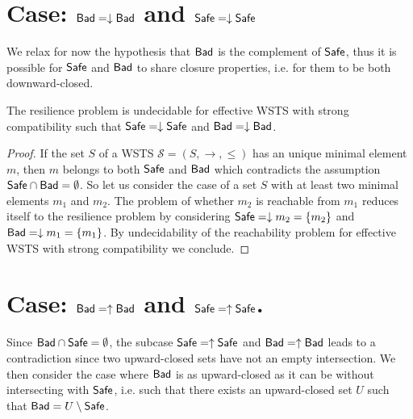 

\section{Case: $\textsf{Bad}=\downarrow \textsf{Bad}$ and $\textsf{Safe}=\downarrow \textsf{Safe}$}\label{case down down}

We relax for now the hypothesis that $\Bad$ is the complement of $\Safe$, thus it is possible for $\Safe$ and $\Bad$ to share closure properties, i.e. for them to be both downward-closed.



\begin{theorem}\label{down-down}
The resilience problem is undecidable for  effective WSTS with  strong  compatibility such that
$\textsf{Safe}=\downarrow \textsf{Safe}$
and $\textsf{Bad}=\downarrow \textsf{Bad}$.
\end{theorem}

\begin{proof}
If the set $S$ of a WSTS $\mathscr{S}=(S,\rightarrow, \leq)$ has an unique minimal element $m$, then $m$ belongs to both $\Safe$ and $\Bad$ which contradicts the assumption $\textsf{Safe} \cap \textsf{Bad}= \emptyset$. So let us consider the case of a set $S$ with at least two minimal elements $m_1$ and $m_2$.
The problem of whether $m_2$ is reachable from $m_1$ reduces itself to the resilience problem by considering $\textsf{Safe}=\downarrow m_2 = \{ m_2\}$ and $\textsf{Bad}=\downarrow m_1 = \{ m_1\}$. By undecidability of the reachability problem for effective WSTS with strong compatibility we conclude.  
\end{proof}


\section{Case: $\textsf{Bad}=\uparrow \textsf{Bad}$ and $\textsf{Safe}=\uparrow \textsf{Safe}$.}\label{case up up}



Since $\textsf{Bad} \cap \textsf{Safe} = \emptyset$, the subcase $\textsf{Safe} = \uparrow \textsf{Safe}$ and $\textsf{Bad} = \uparrow \textsf{Bad}$ leads to a contradiction since two upward-closed sets have not an empty intersection. We then consider the case where $\Bad$ is as upward-closed
as it can be without intersecting with $\Safe$,
i.e. 
such that there exists an upward-closed set $U$
such that $\textsf{Bad} = U \setminus \textsf{Safe}$.

\iffalse
\alain{à quoi ça sert ici ?: quelle signification ?Decidability of $U$ and $\Safe$ imply the decidability of $\Bad$.}
\mathieu{Pas convaincu que ça serve, je vais enlever}
\fi

